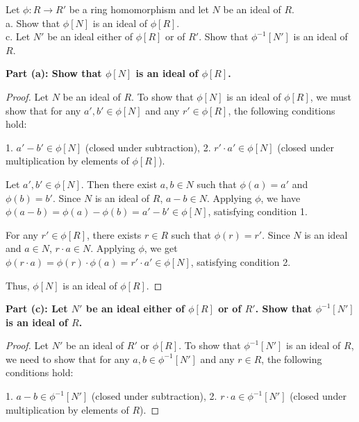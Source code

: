 \documentclass[12pt]{amsart}
\theoremstyle{definition}
\numberwithin{equation}{section}
\theoremstyle{plain}
\begin{document}
\begin{exercise}{22} Let $\phi : R \rightarrow R'$ be a ring homomorphism and let $N$ be an ideal of $R$.\\
    a. Show that $\phi[N]$ is an ideal of $\phi[R]$.\\
    c. Let $N'$ be an ideal either of $\phi[R]$ or of $R'$. Show that $\phi^{-1}[N']$ is an ideal of $R$.
    

    \textbf{Part (a): Show that \(\phi[N]\) is an ideal of \(\phi[R]\).}
    
\begin{proof}
    Let \( N \) be an ideal of \( R \). To show that \( \phi[N] \) is an ideal of \( \phi[R] \), we must show that for any \( a', b' \in \phi[N] \) and any \( r' \in \phi[R] \), the following conditions hold:
    
    1. \( a' - b' \in \phi[N] \) (closed under subtraction),
    2. \( r' \cdot a' \in \phi[N] \) (closed under multiplication by elements of \( \phi[R] \)).
    
    Let \( a', b' \in \phi[N] \). Then there exist \( a, b \in N \) such that \( \phi(a) = a' \) and \( \phi(b) = b' \). Since \( N \) is an ideal of \( R \), \( a - b \in N \). Applying \( \phi \), we have \( \phi(a - b) = \phi(a) - \phi(b) = a' - b' \in \phi[N] \), satisfying condition 1.
    
    For any \( r' \in \phi[R] \), there exists \( r \in R \) such that \( \phi(r) = r' \). Since \( N \) is an ideal and \( a \in N \), \( r \cdot a \in N \). Applying \( \phi \), we get \( \phi(r \cdot a) = \phi(r) \cdot \phi(a) = r' \cdot a' \in \phi[N] \), satisfying condition 2.
    
    Thus, \( \phi[N] \) is an ideal of \( \phi[R] \).
    
\end{proof}
\textbf{Part (c): Let \( N' \) be an ideal either of \( \phi[R] \) or of \( R' \). Show that \( \phi^{-1}[N'] \) is an ideal of \( R \).}    
\begin{proof}
    
    Let \( N' \) be an ideal of \( R' \) or \( \phi[R] \). To show that \( \phi^{-1}[N'] \) is an ideal of \( R \), we need to show that for any \( a, b \in \phi^{-1}[N'] \) and any \( r \in R \), the following conditions hold:
    
    1. \( a - b \in \phi^{-1}[N'] \) (closed under subtraction),
    2. \( r \cdot a \in \phi^{-1}[N'] \) (closed under multiplication by elements of \( R \)).
    

\end{proof}
\end{exercise}
\end{document}
